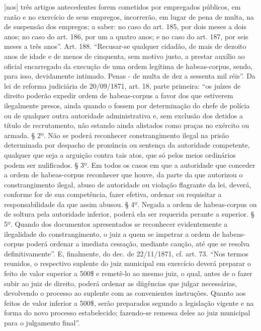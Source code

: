 {  {[}nos{]} três artigos antecedentes forem cometidos por empregados
  públicos, em razão e no exercício de seus empregos, incorrerão, em
  lugar de pena de multa, na de suspensão dos empregos; a saber: no caso
  do art. 185, por dois meses a dois anos; no caso do art. 186, por um a
  quatro anos; e no caso do art. 187, por seis meses a três anos''. Art.
  188. ``Recusar-se qualquer cidadão, de mais de dezoito anos de idade e
  de menos de cinquenta, sem motivo justo, a prestar auxílio ao oficial
  encarregado da execução de uma ordem legítima de habeas-corpus, sendo,
  para isso, devidamente intimado. Penas - de multa de dez a sessenta
  mil réis''. Da lei de reforma judiciária de 20/09/1871, art. 18, parte
  primeira: ``os juízes de direito poderão expedir ordem de
  habeas-corpus a favor dos que estiverem ilegalmente presos, ainda
  quando o fossem por determinação do chefe de polícia ou de qualquer
  outra autoridade administrativa e, sem exclusão dos detidos a título
  de recrutamento, não estando ainda alistados como praças no exército
  ou armada. § 2º. Não se poderá reconhecer constrangimento ilegal na
  prisão determinada por despacho de pronúncia ou sentença da autoridade
  competente, qualquer que seja a arguição contra tais atos, que só
  pelos meios ordinários podem ser nulificados. § 3º. Em todos os casos
  em que a autoridade que conceder a ordem de habeas-corpus reconhecer
  que houve, da parte da que autorizou o constrangimento ilegal, abuso
  de autoridade ou violação flagrante da lei, deverá, conforme for de
  sua competência, fazer efetiva, ordenar ou requisitar a
  responsabilidade da que assim abusou. § 4º. Negada a ordem de
  habeas-corpus ou de soltura pela autoridade inferior, poderá ela ser
  requerida perante a superior. § 5º. Quando dos documentos apresentados
  se reconhecer evidentemente a ilegalidade do constrangimento, o juiz a
  quem se impetrar a ordem de habeas-corpus poderá ordenar a imediata
  cessação, mediante caução, até que se resolva definitivamente''. E,
  finalmente, do dec. de 22/11/1871, cf. art. 73. ``Nos termos reunidos,
  o respectivo suplente do juiz municipal em exercício deverá preparar o
  feito de valor superior a 500\$ e remetê-lo ao mesmo juiz, o qual,
  antes de o fazer subir ao juiz de direito, poderá ordenar as
  diigências que julgar necessárias, devolvendo o processo ao suplente
  com as convenientes instruções. Quanto aos feitos de valor inferior a
  500\$, serão preparados segundo a legislação vigente e na forma do
  novo processo estabelecido; fazendo-se remessa deles ao juiz municipal
  para o julgamento final''.}

